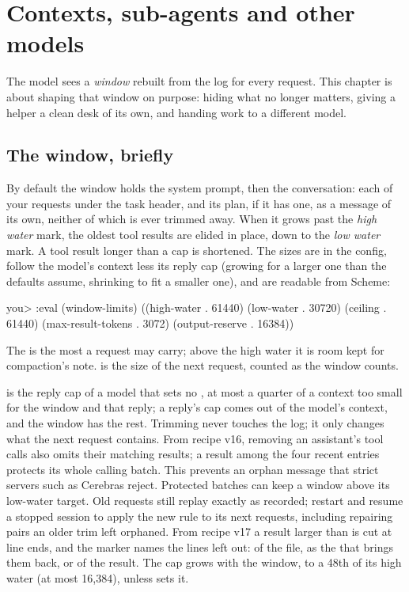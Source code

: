 \chapter{Contexts, sub-agents and other models}
\label{ch:contexts}

The model sees a \emph{window} rebuilt from the log for every request. This
chapter is about shaping that window on purpose: hiding what no longer
matters, giving a helper a clean desk of its own, and handing work to a
different model.

\section{The window, briefly}

By default the window holds the system prompt, then the conversation:
each of your requests under the task header, and its plan, if it has one,
as a message of its own, neither of which is ever trimmed away. When it grows past the \emph{high water} mark, the oldest
tool results are elided in place, down to the \emph{low water} mark. A tool
result longer than a cap is shortened. The sizes are in the config, follow
the model's context less its reply cap (growing for a larger one than the
defaults assume, shrinking to fit a smaller one), and are readable from
Scheme:

\begin{txt}
you> :eval (window-limits)
((high-water . 61440) (low-water . 30720) (ceiling . 61440) (max-result-tokens . 3072) (output-reserve . 16384))
\end{txt}

The  is the most a request may carry; above the high water it
is room kept for compaction's note.  is the size of
the next request, counted as the window counts.

 is the reply cap of a model that sets no
, at most a quarter of a context too small for the window
and that reply; a reply's cap comes
out of the model's context, and the window has the rest. Trimming never touches
the log; it only changes what the next request contains. From recipe v16,
removing an assistant's tool calls also omits their matching results;
a result among the four recent entries protects its whole calling batch.
This prevents an orphan  message that strict servers such as
Cerebras reject. Protected batches can keep a window above its low-water
target. Old requests still replay exactly as recorded; restart and resume
a stopped session to apply the new rule to its next requests, including
repairing pairs an older trim left orphaned. From recipe v17 a result
larger than  is cut at line ends, and the marker
names the lines left out: of the file, as the  that brings
them back, or of the result. The cap grows with the window, to a 48th of
its high water (at most 16,384), unless  sets it.

